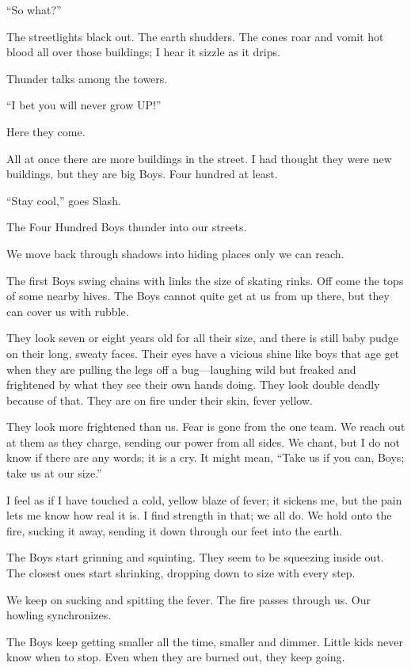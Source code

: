 “So what?”

The streetlights black out. The earth shudders. The cones roar and vomit hot blood all over those buildings; I hear it sizzle as it drips.

Thunder talks among the towers.

“I bet you will never grow UP!”

Here they come.

All at once there are more buildings in the street. I had thought they were new buildings, but they are big Boys. Four hundred at least.

“Stay cool,” goes Slash.

The Four Hundred Boys thunder into our streets.

We move back through shadows into hiding places only we can reach.

The first Boys swing chains with links the size of skating rinks. Off come the tops of some nearby hives. The Boys cannot quite get at us from up there, but they can cover us with rubble.

They look seven or eight years old for all their size, and there is still baby pudge on their long, sweaty faces. Their eyes have a vicious shine like boys that age get when they are pulling the legs off a bug—laughing wild but freaked and frightened by what they see their own hands doing. They look double deadly because of that. They are on fire under their skin, fever yellow.

They look more frightened than us. Fear is gone from the one team. We reach out at them as they charge, sending our power from all sides. We chant, but I do not know if there are any words; it is a cry. It might mean, “Take us if you can, Boys; take us at our size.”

I feel as if I have touched a cold, yellow blaze of fever; it sickens me, but the pain lets me know how real it is. I find strength in that; we all do. We hold onto the fire, sucking it away, sending it down through our feet into the earth.

The Boys start grinning and squinting. They seem to be squeezing inside out. The closest ones start shrinking, dropping down to size with every step.

We keep on sucking and spitting the fever. The fire passes through us. Our howling synchronizes.

The Boys keep getting smaller all the time, smaller and dimmer. Little kids never know when to stop. Even when they are burned out, they keep going.

